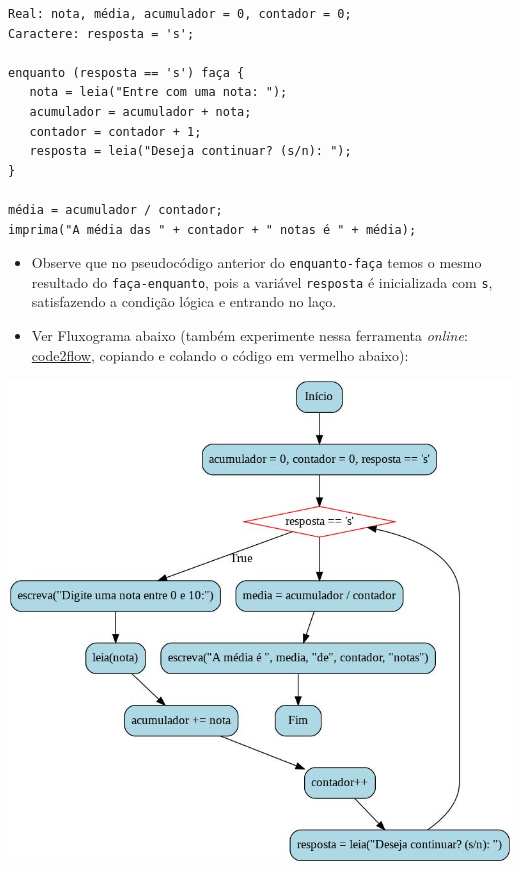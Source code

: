 \documentclass[12pt,a4paper]{article}
\providecommand{\tightlist}{%
      \setlength{\itemsep}{0pt}\setlength{\parskip}{0pt}}
\begin{document}
\begin{verbatim}
Real: nota, média, acumulador = 0, contador = 0;
Caractere: resposta = 's';

enquanto (resposta == 's') faça {
   nota = leia("Entre com uma nota: ");
   acumulador = acumulador + nota;
   contador = contador + 1;
   resposta = leia("Deseja continuar? (s/n): ");
}

média = acumulador / contador;
imprima("A média das " + contador + " notas é " + média);
\end{verbatim}

    \begin{itemize}
\tightlist
\item
  Observe que no pseudocódigo anterior do \texttt{enquanto-faça} temos o
  mesmo resultado do \texttt{faça-enquanto}, pois a variável
  \texttt{resposta} é inicializada com \texttt{s}, satisfazendo a
  condição lógica e entrando no laço.
\end{itemize}

    \begin{itemize}
\tightlist
\item
  Ver Fluxograma abaixo (também experimente nessa ferramenta
  \emph{online}: \href{https://app.code2flow.com/}{code2flow}, copiando
  e colando o código em vermelho abaixo):
\end{itemize}

\includegraphics{"figs/flowchartCap4a.png"}
\end{document}
